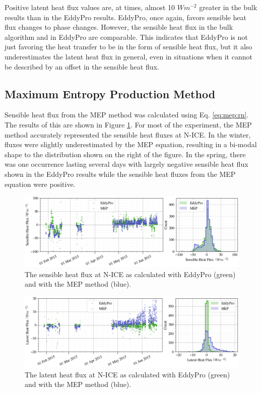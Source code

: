 Positive latent heat flux values are, at times, almost 10 $Wm^{-2}$ greater in the bulk results than in the EddyPro results. EddyPro, once again, favors sensible heat flux changes to phase changes. However, the sensible heat flux in the bulk algorithm and in EddyPro are comparable. This indicates that EddyPro is not just favoring the heat transfer to be in the form of sensible heat flux, but it also underestimates the latent heat flux in general, even in situations when it cannot be described by an offset in the sensible heat flux. 

 \subsection{Maximum Entropy Production Method}
Sensible heat flux from the MEP method was calculated using Eq. \ref{eq:mep:rn}. The results of this are shown in Figure \ref{fig:mep:sensible}. For most of the experiment, the MEP method accurately represented the sensible heat fluxes at N-ICE. In the winter, fluxes were slightly underestimated by the MEP equation, resulting in a bi-modal shape to the distribution shown on the right of the figure. In the spring, there was one occurrence lasting several days with largely negative sensible heat flux shown in the EddyPro results while the sensible heat fluxes from the MEP equation were positive. 

\begin{figure}[h!]
    \centering
    \includegraphics[width=1\linewidth]{figures/chapter5/MEPSensible.png}
    \caption[Sensible heat flux from the MEP method compared to EddyPro.]{The sensible heat flux at N-ICE as calculated with EddyPro (green) and with the MEP method (blue).}
    \label{fig:mep:sensible}
\end{figure}
\begin{figure}[h!]
    \centering
    \includegraphics[width=1\linewidth]{figures/chapter5/MEPLatent.png}
    \caption[Latent heat flux from the MEP method compared to EddyPro.]{The latent heat flux at N-ICE as calculated with EddyPro (green) and with the MEP method (blue).}
    \label{fig:mep:latent}
\end{figure}


